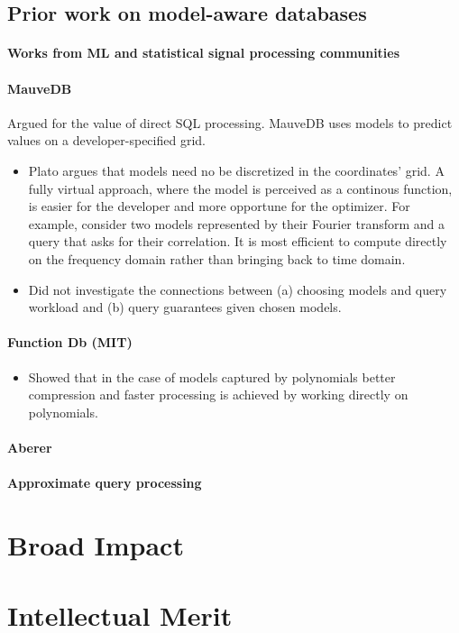 \subsection{Prior work on model-aware databases}

\paragraph{Works from ML and statistical signal processing communities} 

\paragraph{MauveDB} Argued for the value of direct SQL processing. MauveDB uses models to predict values on a developer-specified grid. 

\begin{itemize}
\item Plato argues that models need no be discretized in the coordinates' grid. A fully virtual approach, where the model is perceived as a continous function, is easier for the developer and more opportune for the optimizer. For example, consider two models represented by their Fourier transform and a query that asks for their correlation. It is most efficient to compute directly on the frequency domain rather than bringing back to time domain.
%
\item Did not investigate the connections between (a) choosing models and query workload and (b) query guarantees given chosen models.
\end{itemize}


\paragraph{Function Db (MIT)} 
\begin{itemize}
\item Showed that in the case of models captured by polynomials better compression and faster processing is achieved by working directly on polynomials.
\end{itemize}


\paragraph{Aberer}


\paragraph{Approximate query processing}

\section{Broad Impact}
\label{sec:broad-impact}


\section{Intellectual Merit}
\label{sec:intellectual-merit}

